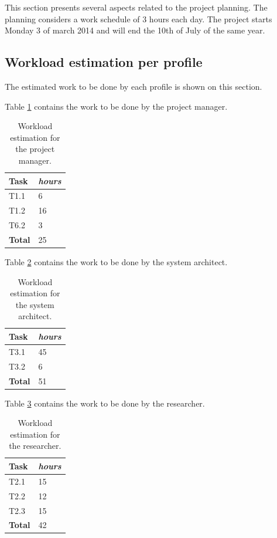This section presents several aspects related to the project planning. The planning considers a work schedule of 3 hours each day. The project starts Monday 3 of march 2014 and will end the 10th of July of the same year.

\subsection*{Workload estimation per profile}

The estimated work to be done by each profile is shown on this section. 

Table \ref{tab:manager} contains the work to be done by the project manager.

\begin{table}[ht]
  \centering
  \caption{Workload estimation for the project manager.}\label{tab:manager}
  \begin{tabular}{ll}
    \toprule
      \textbf{Task} & \emph{hours}\\
    \midrule
      T1.1 & 6\\
      T1.2 & 16\\
      T6.2 & 3\\
    \bottomrule
      \textbf{Total} & 25\\
  \end{tabular}
\end{table}

Table \ref{tab:architect} contains the work to be done by the system architect.

\begin{table}[ht]
  \centering
  \caption{Workload estimation for the system architect.}\label{tab:architect}
  \begin{tabular}{ll}
    \toprule
      \textbf{Task} & \emph{hours}\\
    \midrule
      T3.1 & 45\\
      T3.2 & 6\\
    \bottomrule
      \textbf{Total} & 51\\
  \end{tabular}
\end{table}

Table \ref{tab:researcher} contains the work to be done by the researcher.

\begin{table}[ht]
  \centering
  \caption{Workload estimation for the researcher.}\label{tab:researcher}
  \begin{tabular}{ll}
    \toprule
      \textbf{Task} & \emph{hours}\\
    \midrule
      T2.1 & 15\\
      T2.2 & 12\\
      T2.3 & 15\\
    \bottomrule
      \textbf{Total} & 42\\
  \end{tabular}
\end{table}

